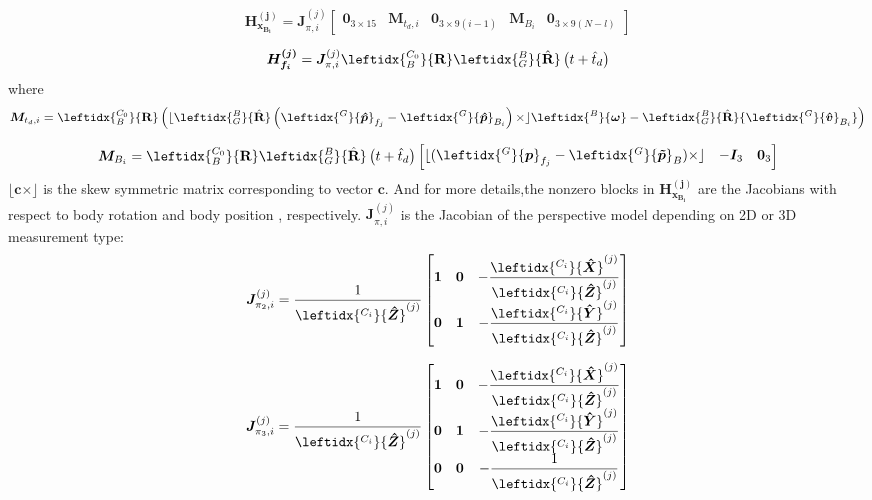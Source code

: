 \documentclass[a4paper, 10pt, conference]{ieeeconf}      %
\begin{document}
\begin{equation}
\bm{H_{x_{B_i}}^{(j)}}=\bm J_{\pi,i}^{(j)}\left[\begin{matrix} \bm 0_{3 \times 15} & \bm M_{t_d,i} & \bm 0_{3 \times 9(i-1)} & \bm M_{B_i} & \bm 0_{3 \times 9(N-l)}
\end{matrix} \right] 
\end{equation}

\begin{equation}
\bm{H_{f_i}^{(j)}}=\bm J_{\pi,i}^{(j)} \leftidx{_B^{C_0}}{ {\textbf R}} \leftidx{_G^B}{\hat {\textbf R}} \left( t + \hat t_d \right) 
\end{equation}
where
\begin{equation}
\bm M_{t_d,i}  = \leftidx{_B^{C_0}}{ \textbf R} \left( 
\lfloor
 \leftidx{_G^B}{\hat {\textbf R}} \left(  {\leftidx{^{G}}{\bm {\hat p} }_{f_j}}-{\leftidx{^{G}}{\bm {\hat p}}_{B_{i}}} 
  \right) \times
 \rfloor
 \leftidx{^B}{\bm \omega} -   \leftidx{_G^B}{\hat {\textbf R}} {\leftidx{^{G}}{\bm {\hat v}}_{B_{i}}} 
 \right) 
\end{equation}

\begin{equation}
\bm M_{B_i} =\leftidx{_B^{C_0}}{ {\textbf R}} \leftidx{_G^B}{\hat {\textbf R}} \left( t + \hat t_d \right) 
\left[\begin{matrix}
 \lfloor (\leftidx{^{G}}{\bm { p}}_{f_{j}}-\leftidx{^{G}}{\bm {\tilde p}}_B)\times \rfloor & 
 - \bm I_3 &
  \bm 0_3
\end{matrix} \right] 
\end{equation}
 $ \lfloor \bm c\times \rfloor  $ is the skew symmetric matrix corresponding to vector $ \bm  c $. And for more details,the nonzero blocks in $ \bm{H_{x_{B_i}}^{(j)}} $ are  the Jacobians with respect to  body rotation  and body position , respectively. $ \bm J_{\pi,i}^{(j)} $ is the Jacobian of the perspective model depending on 2D or 3D measurement type:
\begin{equation}
\bm J_{\pi_2,i}^{(j)}=  \frac{1}{\leftidx{^{C_{i}}}{\bm {\hat Z}}^{(j)}}\left[ \begin{matrix} \bm 1 & \bm 0 & - \dfrac{\leftidx{^{C_{i}}}{\bm {\hat X}}^{(j)}}{\leftidx{^{C_{i}}}{\bm {\hat Z}}^{(j)}} \\ \bm 0 & \bm 1 & - \dfrac{\leftidx{^{C_{i}}}{\bm {\hat Y}}^{(j)}}{\leftidx{^{C_{i}}}{\bm {\hat Z}}^{(j)}} \end{matrix} \right]
\end{equation}

\begin{equation}
\bm J_{\pi_3,i}^{(j)}=  \frac{1}{\leftidx{^{C_{i}}}{\bm {\hat Z}}^{(j)}}\left[ \begin{matrix} \bm 1 & \bm 0 & - \dfrac{\leftidx{^{C_{i}}}{\bm {\hat X}}^{(j)}}{\leftidx{^{C_{i}}}{\bm {\hat Z}}^{(j)}} \\
 \bm 0 & \bm 1 & - \dfrac{\leftidx{^{C_{i}}}{\bm {\hat Y}}^{(j)}}{\leftidx{^{C_{i}}}{\bm {\hat Z}}^{(j)}}  \\
 \bm 0 & \bm 0 & - \dfrac{1}{\leftidx{^{C_{i}}}{\bm {\hat Z}}^{(j)}} 
 
 \end{matrix} \right]
\end{equation}
\end{document}
